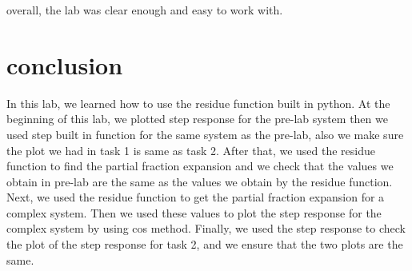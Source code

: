 \documentclass[12pt]{report}
\begin{document}
overall, the lab was clear enough and easy to work with. 




\section{conclusion}


In this lab, we learned how to use the residue function built in python. At the beginning of this lab, we plotted step response for the pre-lab system then we used step built in function for the same system as the pre-lab, also we make sure the plot we had in task 1 is same as task 2. After that, we used the residue function to find the partial fraction expansion and we check that the values we obtain in pre-lab are the same as the values we obtain by the residue function. Next, we used the residue function to get the partial fraction expansion for a complex system. Then we used these values to plot the step response for the complex system by using cos method. Finally, we used the step response to check the plot of the step response for task 2, and we ensure that the two plots are the same.

\newpage
\end{document}
